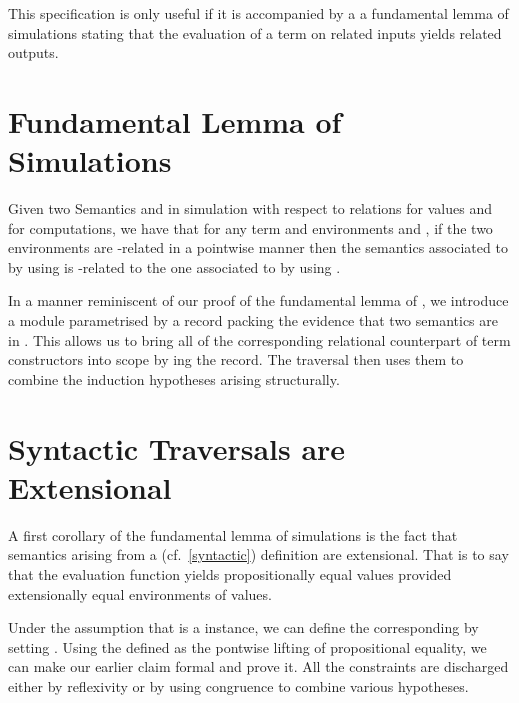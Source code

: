 This specification is only useful if it is accompanied by a a fundamental lemma of
simulations stating that the evaluation of a term on related inputs yields related
outputs.

\section{Fundamental Lemma of Simulations}

Given two Semantics  and  in simulation with respect to relations
 for values and  for computations, we have that for any term 
and environments  and , if the two environments are -related
in a pointwise manner then the semantics associated to  by  using 
is -related to the one associated to  by  using .

In a manner reminiscent of our proof of the fundamental lemma of , we
introduce a  module parametrised by a record packing the evidence
that two semantics are in . This allows us to bring all of the
corresponding relational counterpart of term constructors into scope by ing
the record. The traversal then uses them to combine the induction hypotheses arising
structurally.




\section{Syntactic Traversals are Extensional}

A first corollary of the fundamental lemma of simulations is the fact that semantics
arising from a  (cf.~\cref{syntactic}) definition are extensional. That
is to say that the evaluation function yields propositionally equal values provided
extensionally equal environments of values.

Under the assumption that  is a  instance, we can define the
corresponding   by setting
.
Using  the  defined as the pontwise lifting of propositional equality,
we can make our earlier claim formal and prove it. All the constraints are discharged
either by reflexivity or by using congruence to combine various hypotheses.

